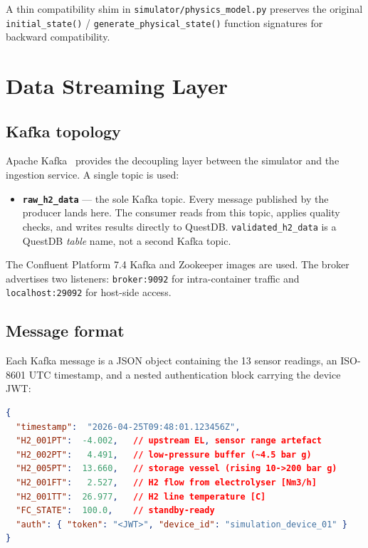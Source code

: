 A thin compatibility shim in \texttt{simulator/physics\_model.py} preserves
the original \texttt{initial\_state()} / \texttt{generate\_physical\_state()}
function signatures for backward compatibility.

\section{Data Streaming Layer}
\label{sec:streaming}

\subsection{Kafka topology}
\label{subsec:kafka}

Apache Kafka~\cite{kafka} provides the decoupling layer between the
simulator and the ingestion service.
A single topic is used:

\begin{itemize}
  \item \textbf{\texttt{raw\_h2\_data}} — the sole Kafka topic.
        Every message published by the producer lands here.
        The consumer reads from this topic, applies quality checks, and
        writes results directly to QuestDB.
        \texttt{validated\_h2\_data} is a QuestDB \emph{table} name, not a
        second Kafka topic.
\end{itemize}

The Confluent Platform 7.4 Kafka and Zookeeper images are used.
The broker advertises two listeners: \texttt{broker:9092} for
intra-container traffic and \texttt{localhost:29092} for host-side access.

\subsection{Message format}
\label{subsec:message-format}

Each Kafka message is a JSON object containing the 13 sensor readings,
an ISO-8601 UTC timestamp, and a nested authentication block carrying the
device JWT:

\begin{lstlisting}[language=json, caption={Example Kafka message (abridged).},
                   label={lst:kafka-message}]
{
  "timestamp":  "2026-04-25T09:48:01.123456Z",
  "H2_001PT":  -4.002,   // upstream EL, sensor range artefact
  "H2_002PT":   4.491,   // low-pressure buffer (~4.5 bar g)
  "H2_005PT":  13.660,   // storage vessel (rising 10->200 bar g)
  "H2_001FT":   2.527,   // H2 flow from electrolyser [Nm3/h]
  "H2_001TT":  26.977,   // H2 line temperature [C]
  "FC_STATE":  100.0,    // standby-ready
  "auth": { "token": "<JWT>", "device_id": "simulation_device_01" }
}
\end{lstlisting}

